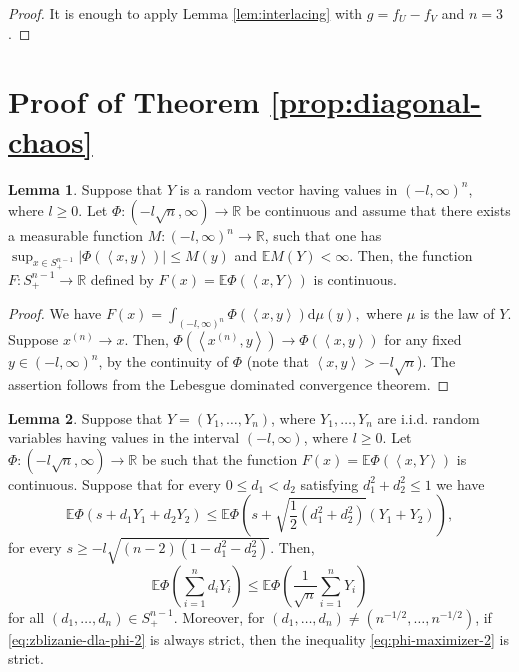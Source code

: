 \documentclass[11pt]{amsart}
\newcommand{\dd}{\mathrm{d}}
\newcommand{\1}{\mathbf{1}}
\newcommand{\R}{\mathbb{R}}
\newcommand{\E}{\mathbb{E}}
\newcommand{\scal}[2]{\left\langle #1, #2\right\rangle}
\theoremstyle{definition}
\newtheorem{lemma}{Lemma}
\theoremstyle{definition}
\theoremstyle{remark}
\begin{document}
\begin{proof}
It is enough to apply Lemma \ref{lem:interlacing} with $g=f_U-f_V$ and $n=3$.
\end{proof}




\section{Proof of Theorem \ref{prop:diagonal-chaos}}\label{sec:gaussy}

\begin{lemma}\label{lem:continuity}
Suppose that $Y$ is a random vector having values in $(-l, \infty)^n$, where $l \geq 0$. Let $\Phi: (-l \sqrt{n}, \infty) \to \R$ be continuous and assume that there exists a measurable function $M:(-l,\infty)^n \to \R$, such that one has $\sup_{x \in S_+^{n-1}}|\Phi(\scal{x}{y})| \leq M(y)$ and $\E M(Y)<\infty$. Then, the function $F:S_+^{n-1} \to \R$ defined by $F(x) = \E \Phi(\scal{x}{Y})$ is continuous.  
\end{lemma}

\begin{proof}
We have
$
F(x) =  \int_{(-l,\infty)^n} \Phi(\scal{x}{y}) \dd \mu(y),
$ 
where $\mu$ is the law of $Y$. Suppose $x^{(n)} \to x$. Then, $\Phi(\scal{x^{(n)}}{y}) \to \Phi(\scal{x}{y})$ for any fixed $y \in (-l,\infty)^n$, by the continuity of $\Phi$ (note that $\scal{x}{y} > -l \sqrt{n}$). The assertion follows from the Lebesgue dominated convergence theorem.    
\end{proof}


\begin{lemma}\label{lem:wyrownywanie-wystarczy}
Suppose that $Y=(Y_1, \ldots, Y_n)$, where $Y_1, \ldots, Y_n$ are i.i.d. random variables having values in the interval $(-l, \infty)$, where $l \geq 0$. Let $\Phi: (-l \sqrt{n}, \infty) \to \R$ be such that the function $F(x)=\E \Phi(\scal{x}{Y})$ is continuous. Suppose that for every $0 \leq d_1 < d_2$ satisfying $d_1^2+d_2^2 \leq 1$  we have
\begin{equation}\label{eq:zblizanie-dla-phi-2}
\E \Phi(s+d_1 Y_1 + d_2Y_2) \leq \E \Phi\left(s+\sqrt{\frac12(d_1^2+d_2^2)}(Y_1 + Y_2) \right), 
\end{equation} 
for every  $s \geq - l \sqrt{(n-2)(1-d_1^2-d_2^2)}$. Then,
\begin{equation}\label{eq:phi-maximizer-2}
\E \Phi\left(\sum_{i=1}^n d_i Y_i \right) \leq \E \Phi\left(\frac{1}{\sqrt{n}}\sum_{i=1}^n Y_i \right)
\end{equation}
for all $(d_1,\ldots, d_n) \in S_+^{n-1}$. Moreover, for $(d_1, \ldots, d_n) \ne (n^{-1/2},\ldots, n^{-1/2})$, if \eqref{eq:zblizanie-dla-phi-2} is always strict, then the inequality \eqref{eq:phi-maximizer-2} is strict.
\end{lemma}
\end{document}
